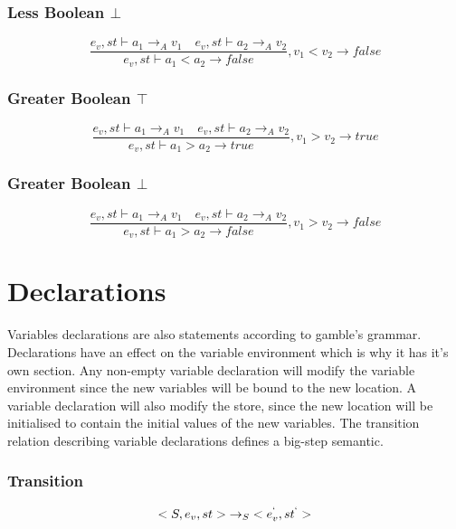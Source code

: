 \subsubsection{Less Boolean $\bot$}
\begin{equation}
	\frac { { e }_{ v },st\vdash { a }_{ 1 }{ \rightarrow  }_{ A }{ v }_{ 1 }\quad { e }_{ v },st\vdash { a }_{ 2 }{ \rightarrow  }_{ A }{ v }_{ 2 } }{ { e }_{ v },st\vdash { a }_{ 1 }<{ a }_{ 2 }{ \rightarrow  }false } ,{ v }_{ 1 }<{ v }_{ 2 }\rightarrow false
\end{equation}

\subsubsection{Greater Boolean $\top$}
\begin{equation}
	\frac { { e }_{ v },st\vdash { a }_{ 1 }{ \rightarrow  }_{ A }{ v }_{ 1 }\quad { e }_{ v },st\vdash { a }_{ 2 }{ \rightarrow  }_{ A }{ v }_{ 2 } }{ { e }_{ v },st\vdash { a }_{ 1 }>{ a }_{ 2 }{ \rightarrow  }true } ,{ v }_{ 1 }>{ v }_{ 2 }\rightarrow true
\end{equation}

\subsubsection{Greater Boolean $\bot$}
\begin{equation}
	\frac { { e }_{ v },st\vdash { a }_{ 1 }{ \rightarrow  }_{ A }{ v }_{ 1 }\quad { e }_{ v },st\vdash { a }_{ 2 }{ \rightarrow  }_{ A }{ v }_{ 2 } }{ { e }_{ v },st\vdash { a }_{ 1 }>{ a }_{ 2 }{ \rightarrow  }false } ,{ v }_{ 1 }>{ v }_{ 2 }\rightarrow false
\end{equation}

\section*{Declarations}
Variables declarations are also statements according to \gls{gamble}'s grammar.
Declarations have an effect on the variable environment which is why it has it's own section.
Any non-empty variable declaration will modify the variable environment since the new variables will be bound to the new location.
A variable declaration will also modify the store, since the new location will be initialised to contain the initial values of the new variables.
The transition relation describing variable declarations defines a big-step semantic.

\subsubsection{Transition}
\begin{equation}
<{ S },{ e }_{ v },st>{ \rightarrow  }_{ S }<{ e }_{ v }^{ ` },{ st }^{ ` }>
\end{equation}

